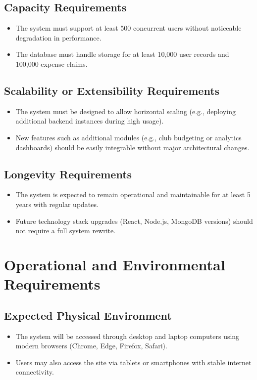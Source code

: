 \documentclass[12pt]{article}
\begin{document}
  \subsection{Capacity Requirements}
    \begin{itemize}
        \item The system must support at least 500 concurrent users without noticeable degradation in performance.
        \item The database must handle storage for at least 10,000 user records and 100,000 expense claims.
    \end{itemize}

  \subsection{Scalability or Extensibility Requirements}
    \begin{itemize}
        \item The system must be designed to allow horizontal scaling (e.g., deploying additional backend instances during high usage).
        \item New features such as additional modules (e.g., club budgeting or analytics dashboards) should be easily integrable without major architectural changes.
    \end{itemize}

  \subsection{Longevity Requirements}
    \begin{itemize}
        \item The system is expected to remain operational and maintainable for at least 5 years with regular updates.
        \item Future technology stack upgrades (React, Node.js, MongoDB versions) should not require a full system rewrite.
    \end{itemize}

\section{Operational and Environmental Requirements}
  \subsection{Expected Physical Environment}
    \begin{itemize}
      \item The system will be accessed through desktop and laptop computers using modern browsers (Chrome, Edge, Firefox, Safari).
      \item Users may also access the site via tablets or smartphones with stable internet connectivity.
    \end{itemize}
\end{document}
